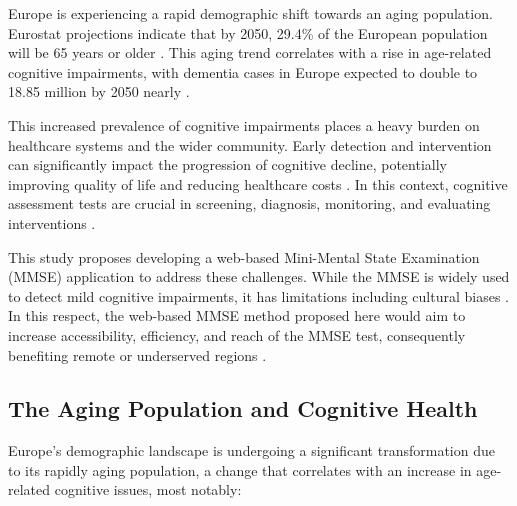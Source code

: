 Europe is experiencing a rapid demographic shift towards an aging population. Eurostat projections indicate that by 2050, 29.4\% of the European population will be 65 years or older \cite{Eurostat2020}. This aging trend correlates with a rise in age-related cognitive impairments, with dementia cases in Europe expected to double to 18.85 million by 2050 nearly \cite{AlzheimerEurope2019}.

This increased prevalence of cognitive impairments places a heavy burden on healthcare systems and the wider community. Early detection and intervention can significantly impact the progression of cognitive decline, potentially improving quality of life and reducing healthcare costs \cite{Livingston2020}. In this context, cognitive assessment tests are crucial in screening, diagnosis, monitoring, and evaluating interventions \cite{Cullen2007, Petersen2018}.

This study proposes developing a web-based Mini-Mental State Examination (MMSE) application to address these challenges. While the MMSE is widely used to detect mild cognitive impairments, it has limitations including cultural biases \cite{Folstein1975, Tombaugh1992}. In this respect, the web-based MMSE method proposed here would aim to increase accessibility, efficiency, and reach of the MMSE test, consequently benefiting remote or underserved regions \cite{Bauer2012, Zygouris2017, Seifan2015}.

\subsection{The Aging Population and Cognitive Health}
Europe's demographic landscape is undergoing a significant transformation due to its rapidly aging population, a change that correlates with an increase in age-related cognitive issues, most notably:

